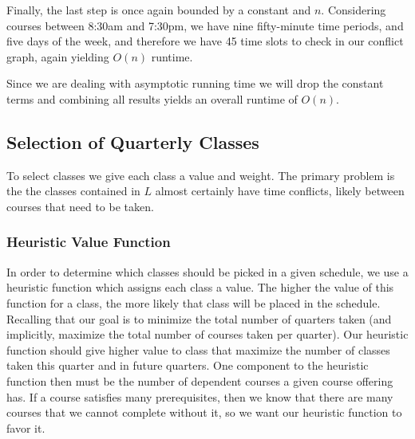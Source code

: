 \documentclass[11pt]{article} %
\begin{document}
Finally, the last step is once again bounded by a constant and $n$. Considering
courses between 8:30am and 7:30pm, we have nine fifty-minute time periods, and
five days of the week, and therefore we have 45 time slots to check in our
conflict graph, again yielding $O(n)$ runtime.

Since we are dealing with asymptotic running time we will drop the constant
terms and combining all results yields an overall runtime of $O(n)$.

\subsection{Selection of Quarterly Classes} To select classes we give each class
a value and weight. The primary problem is the the classes contained in $L$
almost certainly have time conflicts, likely between courses that need to be
taken. 

\subsubsection{Heuristic Value Function} In order to determine which classes
should be picked in a given schedule, we use a heuristic function which assigns
each class a value. The higher the value of this function for a class, the more
likely that class will be placed in the schedule.  Recalling that our goal is to
minimize the total number of quarters taken (and implicitly, maximize the total
number of courses taken per quarter).  Our heuristic function should give higher
value to class that maximize the number of classes taken this quarter and in
future quarters.  One component to the heuristic function then must be the
number of dependent courses a given course offering has. If a course satisfies
many prerequisites, then we know that there are many courses that we cannot
complete without it, so we want our heuristic function to favor it. 
\end{document}
